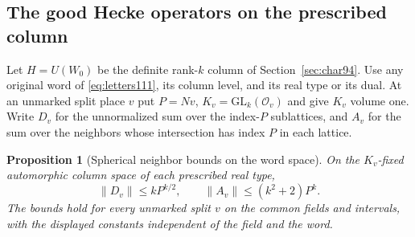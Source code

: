 \documentclass[a4paper,11pt]{article}
\newtheorem{proposition}{Proposition}[section]
\theoremstyle{definition}
\theoremstyle{remark}
\numberwithin{equation}{section}
\begin{document}
\subsection{The good Hecke operators on the prescribed column}\label{nav:VIII-52}
Let \(H=U(W_0)\) be the definite rank-\(k\) column of
Section~\ref{sec:char94}. Use any original word of
\eqref{eq:letters111}, its column level, and its real type
or its dual. At an unmarked split place \(v\) put \(P=Nv\),
\(K_v=\mathrm{GL}_k(\mathcal O_v)\) and give \(K_v\) volume
one. Write \(D_v\) for the unnormalized sum over the
index-\(P\) sublattices, and \(A_v\) for the sum over the
neighbors whose intersection has index \(P\) in each lattice.

\begin{proposition}[Spherical neighbor bounds on the word space]\leavevmode
\label{prop:satake287}
On the \(K_v\)-fixed automorphic column space of each
prescribed real type,
\[
       \|D_v\|\le kP^{k/2},\qquad
       \|A_v\|\le (k^2+2)P^k .
\]
The bounds hold for every unmarked split \(v\) on the common
fields and intervals, with the displayed constants independent
of the field and the word.
\end{proposition}
\end{document}
